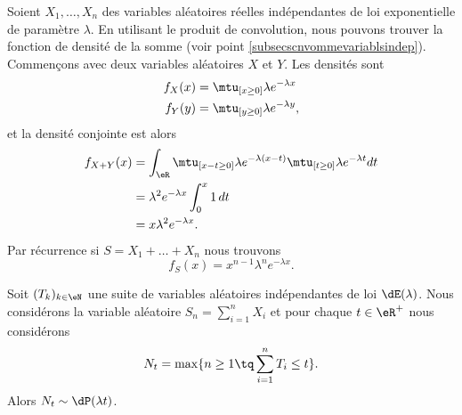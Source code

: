 Soient \( X_1,\ldots,X_n\) des variables aléatoires réelles indépendantes de loi exponentielle de paramètre \( \lambda\). En utilisant le produit de convolution, nous pouvons trouver la fonction de densité de la somme (voir point \ref{subsecscnvommevariablsindep}). Commençons avec deux variables aléatoires \( X\) et \( Y\). Les densités sont
\begin{subequations}
    \begin{align}
        f_X(x)&=\mtu_{[x\geq 0]}\lambda e^{-\lambda x}\\
        f_Y(y)&=\mtu_{[y\geq 0]}\lambda e^{-\lambda y},
    \end{align}
\end{subequations}
et la densité conjointe est alors
\begin{subequations}
    \begin{align}
        f_{X+Y}(x)&=\int_{\eR}\mtu_{[x-t\geq 0]}\lambda e^{-\lambda(x-t)}\mtu_{[t\geq 0]}\lambda e^{-\lambda t}dt\\
        &=\lambda^2 e^{-\lambda x}\int_0^x1\,dt\\
        &=x\lambda^2 e^{-\lambda x}.
    \end{align}
\end{subequations}
Par récurrence si \( S=X_1+\ldots+X_n\) nous trouvons
\begin{equation}
    f_S(x)=x^{n-1}\lambda^n e^{-\lambda x}.
\end{equation}

\begin{proposition}      \label{PropGMntiy}
Soit \( (T_k)_{k\in\eN}\) une suite de variables aléatoires indépendantes de loi \( \dE(\lambda)\). Nous considérons la variable aléatoire \( S_n=\sum_{i=1}^nX_i\) et pour chaque \( t\in\eR^+\) nous considérons
\begin{equation}
    N_t=\max\{ n\geq 1\tq \sum_{i=1}^nT_i\leq t \}.
\end{equation}
Alors \( N_t\sim\dP(\lambda t)\). 

\end{proposition}

